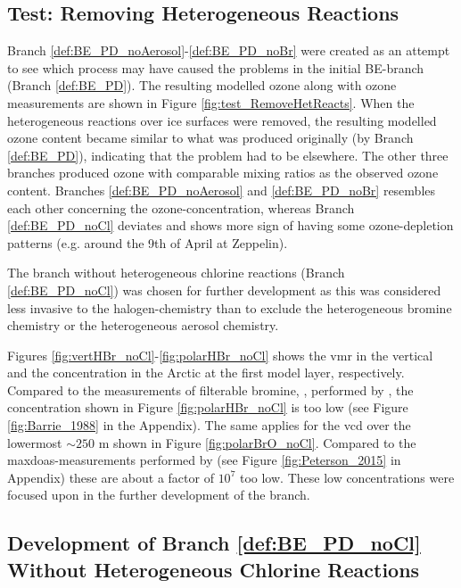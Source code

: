 \subsection{Test: Removing Heterogeneous Reactions}

Branch \ref{def:BE_PD_noAerosol}-\ref{def:BE_PD_noBr} were created as an attempt to see which process may have caused the problems in the initial BE-branch (Branch \ref{def:BE_PD}). The resulting modelled ozone along with ozone measurements are shown in Figure \ref{fig:test_RemoveHetReacts}. When the heterogeneous reactions over ice surfaces were removed, the resulting modelled ozone content became similar to what was produced originally (by Branch \ref{def:BE_PD}), indicating that the problem had to be elsewhere. The other three branches produced ozone with comparable mixing ratios as the observed ozone content. Branches \ref{def:BE_PD_noAerosol} and \ref{def:BE_PD_noBr} resembles each other concerning the ozone-concentration, whereas Branch \ref{def:BE_PD_noCl} deviates and shows more sign of having some ozone-depletion patterns (e.g. around the 9th of April at Zeppelin). 

\medskip

The branch without heterogeneous chlorine reactions (Branch \ref{def:BE_PD_noCl}) was chosen for further development as this was considered less invasive to the halogen-chemistry than to exclude the heterogeneous bromine chemistry or the heterogeneous aerosol chemistry. 

\medskip

Figures \ref{fig:vertHBr_noCl}-\ref{fig:polarHBr_noCl} shows the \acrlong{vmr} in the vertical and the concentration in the Arctic at the first model layer, respectively. Compared to the measurements of filterable bromine, , performed by \cite{barrie}, the concentration shown in Figure \ref{fig:polarHBr_noCl} is too low (see Figure \ref{fig:Barrie_1988} in the Appendix). The same applies for the  \acrshort{vcd} over the lowermost $\sim 250$ m shown in Figure \ref{fig:polarBrO_noCl}. Compared to the \acrshort{maxdoas}-measurements performed by \cite{Peterson2015} (see Figure \ref{fig:Peterson_2015} in Appendix) these are about a factor of $10^7$ too low. These low concentrations were focused upon in the further development of the branch. 



\subsection{Development of Branch \ref{def:BE_PD_noCl} Without Heterogeneous Chlorine Reactions}


